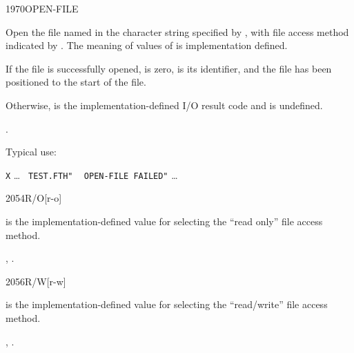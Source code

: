 \begin{worddef}{1970}{OPEN-FILE}
\item {}

	Open the file named in the character string specified by
	, with file access method indicated by
	. The meaning of values of  is
	implementation 	defined.

	If the file is successfully opened,  is zero,
	 is its identifier, and the file has been
	positioned to the start of the file.

	Otherwise,  is the implementation-defined I/O
	result code and  is undefined.

\see {}.

	\begin{rationale} %
		Typical use:

		\tab \word[core]{:} \texttt{X} {\ldots}
				 \texttt{ TEST.FTH"} 
				~  \texttt{OPEN-FILE FAILED"}
			{\ldots} \word[core]{;}
	\end{rationale}
\end{worddef}


\begin{worddef}{2054}{R/O}[r-o]
\item {}

	 is the implementation-defined value for selecting
	the ``read only'' file access method.

\see {},
	.
\end{worddef}


\begin{worddef}{2056}{R/W}[r-w]
\item {}

	 is the implementation-defined value for selecting
	the ``read/write'' file access method.

\see {},
	.
\end{worddef}

